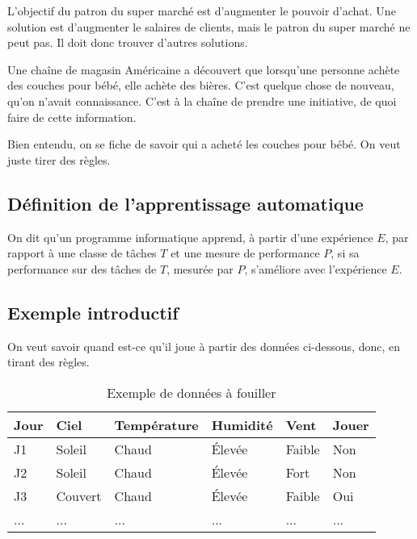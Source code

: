 L'objectif du patron du super marché est d'augmenter le pouvoir d'achat. Une solution est d'augmenter le salaires de clients, mais le patron du super marché ne peut pas. Il doit donc trouver d'autres solutions.

Une chaîne de magasin Américaine a découvert que lorsqu'une personne achète des couches pour bébé, elle achète des bières. C'est quelque chose de nouveau, qu'on n'avait connaissance. C'est à la chaîne de prendre une initiative, de quoi faire de cette information.

Bien entendu, on se fiche de savoir qui a acheté les couches pour bébé. On veut juste tirer des règles.

\subsection{Définition de l'apprentissage automatique}
On dit qu'un programme informatique apprend, à partir d'une expérience $E$, par rapport à une classe de tâches $T$ et une mesure de performance $P$, si sa performance sur des tâches de $T$, mesurée par $P$, s'améliore avec l'expérience $E$.

\subsection{Exemple introductif}
On veut savoir quand est-ce qu'il joue à partir des données ci-dessous, donc, en tirant des règles.
\begin{table}[H]
    \centering
    \begin{tabular}{|l|l|l|l|l|l|}
        \hline
        Jour & Ciel & Température & Humidité & Vent & Jouer \\ \hline
        J1  & Soleil & Chaud & Élevée & Faible & Non  \\ \hline
        J2  & Soleil & Chaud & Élevée & Fort & Non \\ \hline 
        J3  & Couvert & Chaud & Élevée & Faible & Oui \\ \hline
        ... & ... & ... & ... & ... & ... \\ \hline
    \end{tabular}
    \caption{Exemple de données à fouiller}
    \label{tab:my_label}
\end{table}

